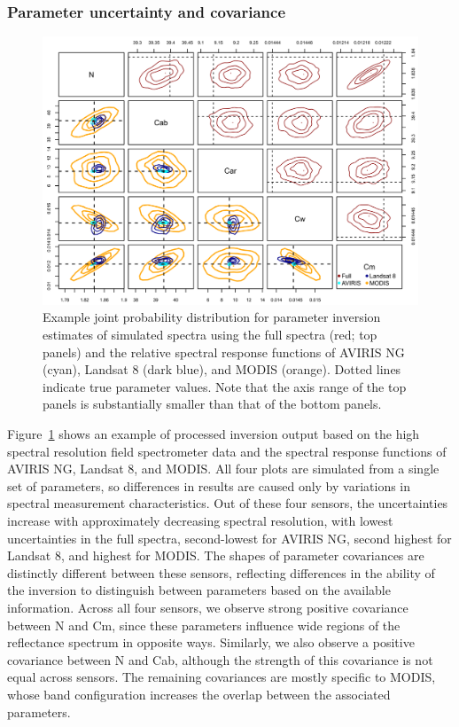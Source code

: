 \subsubsection{Parameter uncertainty and covariance}

\begin{figure}
  \centering
  \includegraphics[width=\textwidth]{2_rtm_inversion/figures/joint_posterior.png}
  \caption{%
    Example joint probability distribution for parameter inversion estimates of simulated spectra using the full spectra (red; top panels) and the relative spectral response functions of AVIRIS NG (cyan), Landsat 8 (dark blue), and MODIS (orange). 
    Dotted lines indicate true parameter values. Note that the axis range of the top panels is substantially smaller than that of the bottom panels.
  }\label{fig:pecanrtm-jointpost}
\end{figure}

Figure~\ref{fig:pecanrtm-jointpost} shows an example of processed inversion output based on the high spectral resolution field spectrometer data and the spectral response functions of AVIRIS NG, Landsat 8, and MODIS\@.
All four plots are simulated from a single set of parameters, so differences in results are caused only by variations in spectral measurement characteristics.%
Out of these four sensors, the uncertainties increase with approximately decreasing spectral resolution, with lowest uncertainties in the full spectra, second-lowest for AVIRIS NG, second highest for Landsat 8, and highest for MODIS\@. %
The shapes of parameter covariances are distinctly different between these sensors, reflecting differences in the ability of the inversion to distinguish between parameters based on the available information.
Across all four sensors, we observe strong positive covariance between N and Cm, since these parameters influence wide regions of the reflectance spectrum in opposite ways.%
Similarly, we also observe a positive covariance between N and Cab, although the strength of this covariance is not equal across sensors.
The remaining covariances are mostly specific to MODIS, whose band configuration increases the overlap between the associated parameters.%

